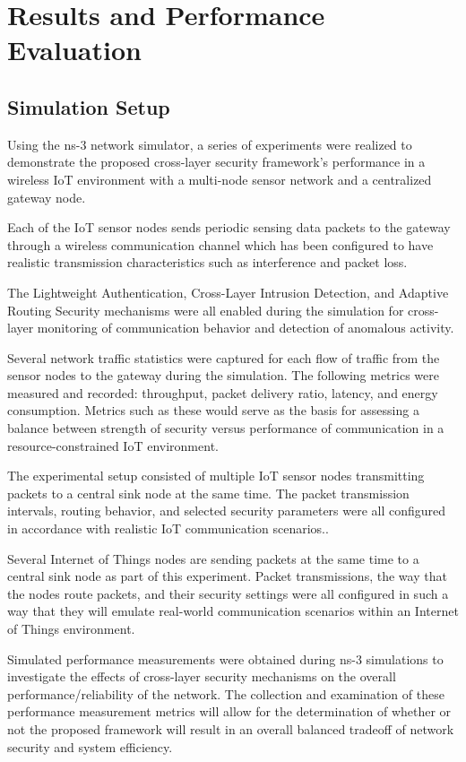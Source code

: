 \documentclass[a4paper,fleqn]{cas-dc}
\numberwithin{equation}{section}
\begin{document}
\section{Results and Performance Evaluation}

\subsection{Simulation Setup}

Using the ns-3 network simulator, a series of experiments were realized to demonstrate the proposed cross-layer security framework's performance in a wireless IoT environment with a multi-node sensor network and a centralized gateway node.

Each of the IoT sensor nodes sends periodic sensing data packets to the gateway through a wireless communication channel which has been configured to have realistic transmission characteristics such as interference and packet loss.

The Lightweight Authentication, Cross-Layer Intrusion Detection, and Adaptive Routing Security mechanisms were all enabled during the simulation for cross-layer monitoring of communication behavior and detection of anomalous activity. 

Several network traffic statistics were captured for each flow of traffic from the sensor nodes to the gateway during the simulation. The following metrics were measured and recorded: throughput, packet delivery ratio, latency, and energy consumption. Metrics such as these would serve as the basis for assessing a balance between strength of security versus performance of communication in a resource-constrained IoT environment. 

The experimental setup consisted of multiple IoT sensor nodes transmitting packets to a central sink node at the same time. The packet transmission intervals, routing behavior, and selected security parameters were all configured in accordance with realistic IoT communication scenarios..

Several Internet of Things nodes are sending packets at the same time to a central sink node as part of this experiment. Packet transmissions, the way that the nodes route packets, and their security settings were all configured in such a way that they will emulate real-world communication scenarios within an Internet of Things environment.

Simulated performance measurements were obtained during ns-3 simulations to investigate the effects of cross-layer security mechanisms on the overall performance/reliability of the network. The collection and examination of these performance measurement metrics will allow for the determination of whether or not the proposed framework will result in an overall balanced tradeoff of network security and system efficiency.
\end{document}

